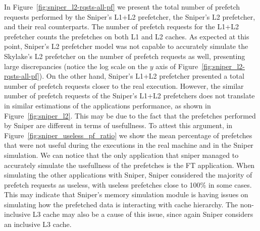 \documentclass[AMA,final,STIX1COL]{WileyNJD-v2}
\begin{document}
In Figure~\ref{fig:sniper_l2-rqsts-all-pf} we present the total number of prefetch requests performed by the Sniper's L1+L2 prefetcher, the Sniper's L2 prefetcher, and their real counterparts. The number of prefetch requests for the L1+L2 prefetcher counts the prefetches on both L1 and L2 caches.
As expected at this point, Sniper's L2 prefetcher model was not capable to accurately simulate the Skylake's L2 prefetcher on the number of prefetch requests as well, presenting large discrepancies (notice the log scale on the $y$ axis of Figure~\ref{fig:sniper_l2-rqsts-all-pf}).
On the other hand, Sniper's L1+L2 prefetcher presented a total number of prefetch requests closer to the real execution. 
However, the similar number of prefetch requests of the Sniper's L1+L2 prefetchers does not translate in similar estimations of the applications performance, as shown in Figure~\ref{fig:sniper_l2}.
This may be due to the fact that the prefetches performed by Sniper are different in terms of usefullness. 
To attest this argument, in Figure~\ref{fig:sniper_useless_pf_ratio} we show the mean percentage of prefetches that were not useful during the executions in the real machine and in the Sniper simulation.
We can notice that the only application that sniper managed to accurately simulate the usefullness of the prefetches is the FT application.
When simulating the other applications with Sniper, Sniper considered the majority of prefetch requests as useless, with useless prefetches close to 100\% in some cases. 
This may indicate that Sniper's memory simulation module is having issues on simulating how the prefetched data is interacting with cache hierarchy. 
The non-inclusive L3 cache may also be a cause of this issue, since again Sniper considers an inclusive L3 cache.


\end{document}
